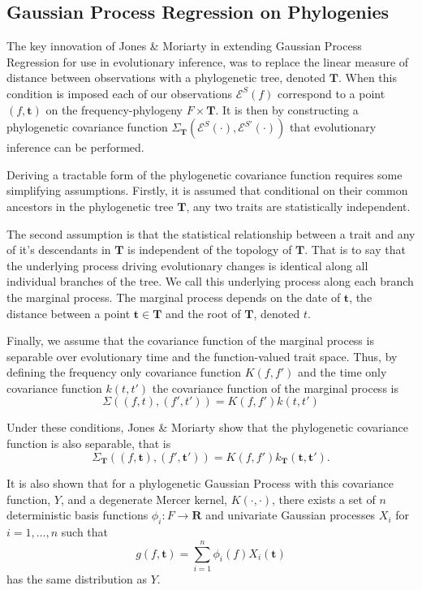 \documentclass[wsdraft]{ws-rv9x6} %
\begin{document}
\subsection{Gaussian Process Regression on Phylogenies}

The key innovation of Jones \& Moriarty\cite{jones2013evolutionary} in extending Gaussian Process Regression \cite{rasmussen2006gaussian} for use in evolutionary inference, was to replace the linear measure of distance between observations with a phylogenetic tree, denoted \(\mathbf{T}\). When this condition is imposed each of our observations \(\mathcal{E}^{S}(f)\) correspond to a point \((f, \mathbf{t})\) on the frequency-phylogeny \(F \times \mathbf{T}\). It is then by constructing a phylogenetic covariance function \(\Sigma_{\mathbf{T}}\left(\mathcal{E}^{S}(\cdot), \mathcal{E}^{S'}(\cdot)\right)\) that evolutionary inference can be performed.

Deriving a tractable form of the phylogenetic covariance function requires some simplifying assumptions. Firstly, it is assumed that conditional on their common ancestors in the phylogenetic tree \(\mathbf{T}\), any two traits are statistically independent. 

The second assumption is that the statistical relationship between a trait and any of it's descendants in \(\mathbf{T}\) is independent of the topology of \(\mathbf{T}\). That is to say that the underlying process driving evolutionary changes is identical along all individual branches of the tree. We call this underlying process along each branch the marginal process. The marginal process depends on the date of \(\mathbf{t}\), the distance between a point \(\mathbf{t} \in \mathbf{T}\) and the root of \(\mathbf{T}\), denoted \(t\). 

Finally, we assume that the covariance function of the marginal process is separable over evolutionary time and the function-valued trait space. Thus, by defining the frequency only covariance function \(K(f,f')\) and the time only covariance function \(k(t,t')\) the covariance function of the marginal process is
\[\Sigma\left((f,t), (f',t')\right) = K(f, f') k(t,t')\]

Under these conditions, Jones \& Moriarty \cite{jones2013evolutionary} show that the phylogenetic covariance function is also separable, that is\[\Sigma_{\mathbf{T}}\left((f,\mathbf{t}), (f',\mathbf{t}')\right) = K(f, f') k_{\mathbf{T}}(\mathbf{t},\mathbf{t}').\] 

It is also shown that for a phylogenetic Gaussian Process with this covariance function, \(Y\), and a degenerate Mercer kernel, \(K(\cdot, \cdot)\), there exists a set of \(n\) deterministic basis functions \(\phi_i: F \to \mathbf{R}\) and univariate Gaussian processes \(X_i\) for \(i = 1,\dots, n\) such that 
\[
g(f, \mathbf{t}) = \sum_{i = 1}^{n} \phi_i(f) X_i(\mathbf{t})
\] 
has the same distribution as \(Y\). 
\end{document}
